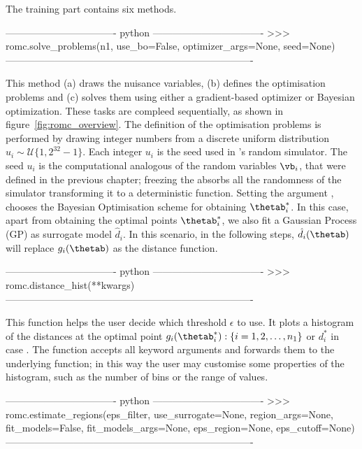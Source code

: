 The training part contains six methods.

\begin{Code}
---------------------------------- python ----------------------------------
>>> romc.solve_problems(n1,
                        use_bo=False,
                        optimizer_args=None,
                        seed=None)
----------------------------------------------------------------------------                    
\end{Code}

\noindent
This method (a) draws the nuisance variables, (b) defines the
optimisation problems and (c) solves them using either a
gradient-based optimizer or Bayesian optimization. These tasks are
compleed sequentially, as shown in figure~\ref{fig:romc_overview}. The
definition of the optimisation problems is performed by drawing
 integer numbers from a discrete uniform distribution
$u_i \sim \mathcal{U}\{1, 2^{32}-1\}$. Each integer $u_i$ is the seed
used in 's random simulator. The seed $u_i$ is the
computational analogous of the random variables $\vb_i$, that were
defined in the previous chapter; freezing the  absorbs all
the randomness of the simulator transforming it to a deterministic
function. Setting the argument , chooses the
Bayesian Optimisation scheme for obtaining $\thetab_i^*$. In this
case, apart from obtaining the optimal points $\thetab_i^*$, we also
fit a Gaussian Process (GP) as surrogate model $\hat{d}_i$. In this
scenario, in the following steps, $\hat{d}_i(\thetab)$ will replace
$g_i(\thetab)$ as the distance function.

\begin{Code}
---------------------------------- python ----------------------------------
>>> romc.distance_hist(**kwargs)
----------------------------------------------------------------------------  
\end{Code}

\noindent
This function helps the user decide which threshold $\epsilon$ to
use. It plots a histogram of the distances at the optimal point
$g_i(\thetab_i^*) : \{i = 1, 2, \ldots, n_1\}$ or $d_i^*$ in case
. The function accepts all keyword arguments and
forwards them to the underlying  function; in
this way the user may customise some properties of the histogram, such
as the number of bins or the range of values.

\begin{Code}
---------------------------------- python ----------------------------------  
>>> romc.estimate_regions(eps_filter,
                          use_surrogate=None,
                          region_args=None,
                          fit_models=False,
                          fit_models_args=None,
                          eps_region=None,
                          eps_cutoff=None)
----------------------------------------------------------------------------
\end{Code}

